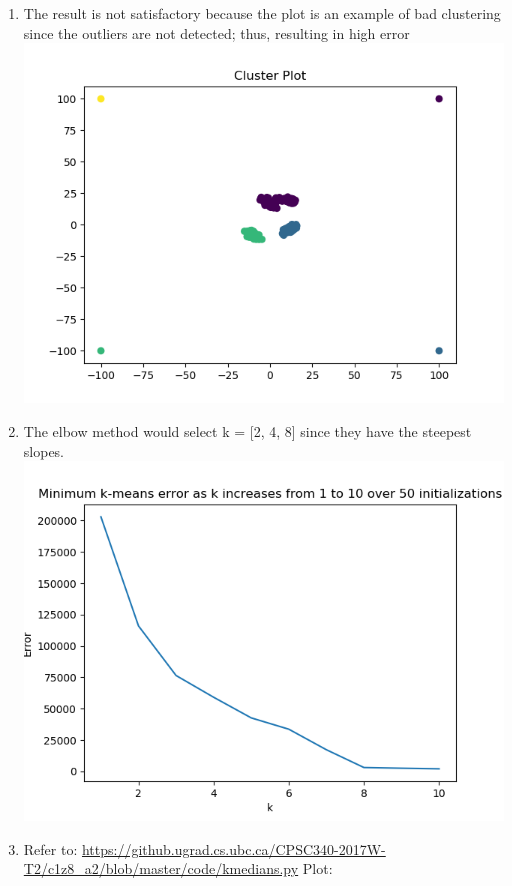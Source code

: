 \documentclass{article}
\def\enum#1{\begin{enumerate}#1\end{enumerate}}
\begin{document}
\enum{
 \item The result is not satisfactory because the plot is an example of bad clustering since the outliers are not detected; thus, resulting in high error \\
 \includegraphics[scale=0.6]{../figs/cluster_kmeans_error.png} 
 \item The elbow method would select k = [2, 4, 8] since they have the steepest slopes. \\
  \includegraphics[scale=0.6]{../figs/cluster_errors.png} 
 \item Refer to:  \url{https://github.ugrad.cs.ubc.ca/CPSC340-2017W-T2/c1z8_a2/blob/master/code/kmedians.py}
 Plot: \\
}
\end{document}
